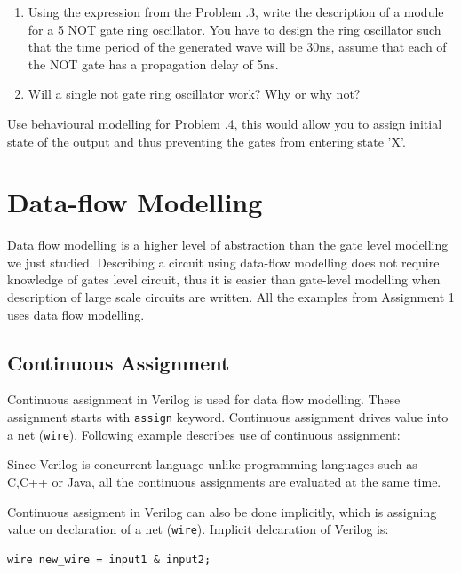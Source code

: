 \documentclass[a4paper,10pt]{article}
\theoremstyle{mytheor}
\newcommand{
  \insertverilog}[3]{
  
}
\newcounter{problemNumber}
\newcounter{pitfallCount} %
\newcommand{\pitfallcounter}[1]{%
  \refstepcounter{pitfallCount}%
  \thepitfallCount%
  \label{#1}}%
\newcommand{\pitfall}[2] {
  \begin{tcolorbox}[arc=1pt,colback=yellow!10!white,colframe=orange!75!black,title=\textbf{Common Pitfall - \pitfallcounter{#1}}]
    #2
  \end{tcolorbox}
}
\newcounter{hintCount} %
\newcommand{\hintcounter}[1]{%
  \refstepcounter{hintCount}%
  \thehintCount%
  \label{#1}}%
\newcounter{hintcnt}
\newcommand{\hint}[2] {
  \begin{tcolorbox}[arc=1pt,colback=blue!5!white,colframe=blue!75!black,title=\textbf{Hint - \hintcounter{#1}}]  
    #2
  \end{tcolorbox}
  \addtocounter{hintcnt}{1}
}
\newcommand{\inlinev}[1]{\lstinline[style=verilog-inline-style]{#1}}
\begin{document}
{\begin {enumerate}
  \item Using the expression from the Problem {\theproblemNumber}.3,
    write the description of a module for a 5 NOT gate ring
    oscillator. You have to design the ring oscillator such that the
    time period of the generated wave will be 30ns, assume that each
    of the NOT gate has a propagation delay of 5ns.
  \item Will a single not gate ring oscillator work? Why or why not?
  \end{enumerate}

  \hint{hint:problem-1}{Use behavioural modelling for Problem \theproblemNumber.4,
    this would allow you to assign initial state of the output and
    thus preventing the gates from entering state 'X'.}  }


\section{Data-flow Modelling}
Data flow modelling is a higher level of abstraction than the gate
level modelling we just studied. Describing a circuit using data-flow
modelling does not require knowledge of gates level circuit, thus it
is easier than gate-level modelling when description of large scale
circuits are written.  All the examples from Assignment 1 uses data
flow modelling.

\subsection{Continuous Assignment}
\label{continuous-assignment}
Continuous assignment in Verilog is used for data flow modelling.
These assignment starts with
\inlinev{assign} keyword. Continuous
assignment drives value into a net
(\inlinev{wire}). Following example
describes use of continuous assignment:

\pitfall{pitfall:verilog-concurrency}{Since Verilog is concurrent language unlike programming
  languages such as C,C++ or Java, all the continuous assignments are
  evaluated at the same time.}

\insertverilog{./verilog_files/continuousAssignment.v}{continuous-assignment}{Example
  usage of continuous assignment.}

Continuous assigment in Verilog can also be done implicitly, which is
assigning value on declaration of a net
(\inlinev{wire}). Implicit delcaration
of Verilog is:
\begin{lstlisting}[style=verilog-inline-style,xleftmargin=.25\textwidth]
  wire new_wire = input1 & input2;
\end{lstlisting}
\end{document}
